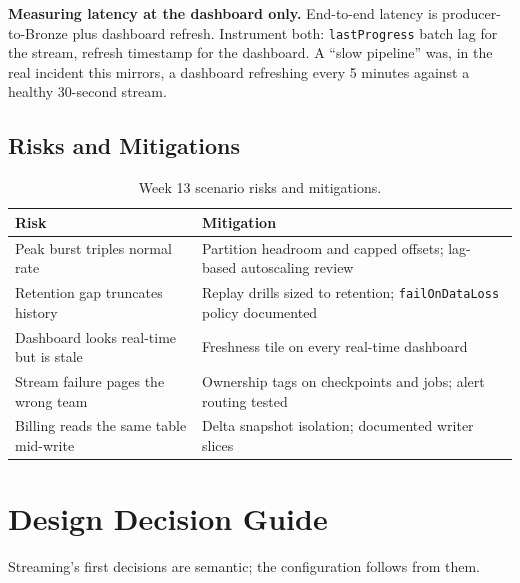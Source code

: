 \begin{pitfall}
\textbf{Measuring latency at the dashboard only.} End-to-end latency is producer-to-Bronze plus dashboard refresh. Instrument both: \texttt{lastProgress} batch lag for the stream, refresh timestamp for the dashboard. A ``slow pipeline'' was, in the real incident this mirrors, a dashboard refreshing every 5 minutes against a healthy 30-second stream.
\end{pitfall}

\subsection{Risks and Mitigations}
\begin{table}[H]
\centering
\small
\begin{tabular}{@{}p{4.6cm}p{7.6cm}@{}}
\toprule
\textbf{Risk} & \textbf{Mitigation} \\
\midrule
Peak burst triples normal rate & Partition headroom and capped offsets; lag-based autoscaling review \\
Retention gap truncates history & Replay drills sized to retention; \texttt{failOnDataLoss} policy documented \\
Dashboard looks real-time but is stale & Freshness tile on every real-time dashboard \\
Stream failure pages the wrong team & Ownership tags on checkpoints and jobs; alert routing tested \\
Billing reads the same table mid-write & Delta snapshot isolation; documented writer slices \\
\bottomrule
\end{tabular}
\caption{Week 13 scenario risks and mitigations.}
\label{tab:ch13-risks}
\end{table}

\section{Design Decision Guide}
%
Streaming's first decisions are semantic; the configuration follows from them.

